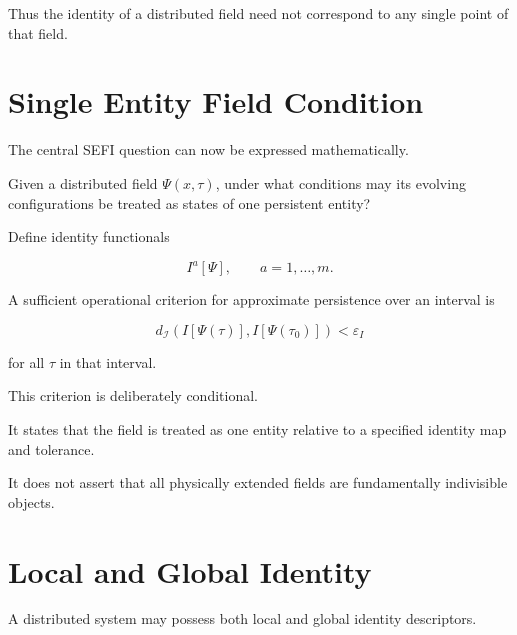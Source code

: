 \documentclass[12pt,oneside]{book}
\begin{document}
Thus the identity of a distributed field need not correspond to
any single point of that field.


\section{Single Entity Field Condition}
\label{sec:single-entity-field-condition}

The central SEFI question can now be expressed mathematically.

Given a distributed field \(\Psi(x,\tau)\), under what
conditions may its evolving configurations be treated as states
of one persistent entity?

Define identity functionals

\begin{equation}
    I^a[\Psi],
    \qquad
    a=1,\ldots,m.
\end{equation}

A sufficient operational criterion for approximate persistence
over an interval is

\begin{equation}
    d_{\mathcal{I}}
    \left(
        I[\Psi(\tau)],
        I[\Psi(\tau_0)]
    \right)
    <
    \varepsilon_I
    \label{eq:single-entity-field-condition}
\end{equation}

for all \(\tau\) in that interval.

This criterion is deliberately conditional.

It states that the field is treated as one entity relative to a
specified identity map and tolerance.

It does not assert that all physically extended fields are
fundamentally indivisible objects.


\section{Local and Global Identity}
\label{sec:local-global-identity}

A distributed system may possess both local and global identity
descriptors.
\end{document}
